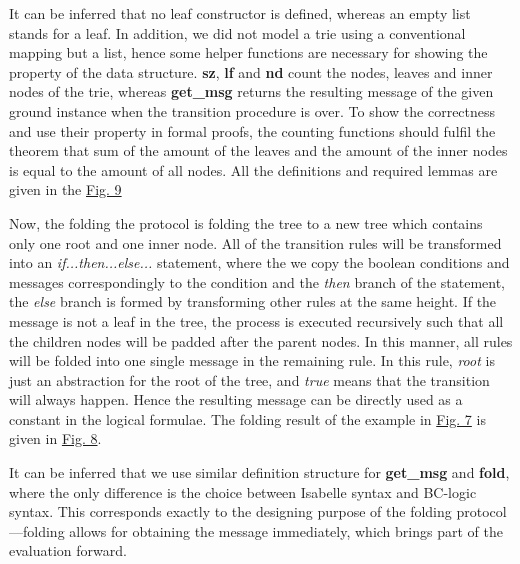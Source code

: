 \documentclass[conference]{IEEEtran}
\begin{document}
It can be inferred that no leaf constructor is defined, whereas an empty list stands for a leaf. In addition, we did not model a trie using a conventional mapping but a list, hence some helper functions are necessary for showing the property of the data structure. \textbf{sz}, \textbf{lf} and \textbf{nd} count the nodes, leaves and inner nodes of the trie, whereas \textbf{get\_msg} returns the resulting message of the given ground instance when the transition procedure is over.
To show the correctness and use their property in formal proofs, the counting functions should fulfil the theorem that sum of the amount of the leaves and the amount of the inner nodes is equal to the amount of all nodes. All the definitions and required lemmas are given in the \hyperref[figure:9]{Fig. 9}

Now, the folding the protocol is folding the tree to a new tree which contains only one root and one inner node. All of the transition rules will be transformed into an \textit{if...then...else...} statement, where the we copy the boolean conditions and messages correspondingly to the condition and the \textit{then} branch of the statement, the \textit{else} branch is formed by transforming other rules at the same height. If the message is not a leaf in the tree, the process is executed recursively such that all the children nodes will be padded after the parent nodes. In this manner, all rules will be folded into one single message in the remaining rule. In this rule, \textit{root} is just an abstraction for the root of the tree, and \textit{true} means that the transition will always happen. Hence the resulting message can be directly used as a constant in the logical formulae. The folding result of the example in \hyperref[figure:7]{Fig. 7} is given in \hyperref[figure:8]{Fig. 8}.

It can be inferred that we use similar definition structure for \textbf{get\_msg} and \textbf{fold}, where the only difference is the choice between Isabelle syntax and BC-logic syntax. This corresponds exactly to the designing purpose of the folding protocol---folding allows for obtaining the message immediately, which brings part of the evaluation forward.
\end{document}

